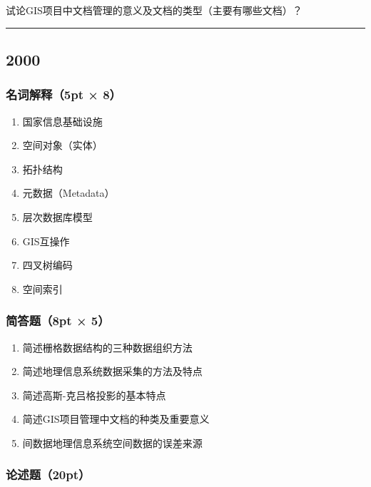 \documentclass[]{article}
\begin{document}
试论GIS项目中文档管理的意义及文档的类型（主要有哪些文档）？

\begin{center}\rule{0.5\linewidth}{\linethickness}\end{center}

\hypertarget{header-n70}{%
\subsection{2000}\label{header-n70}}

\hypertarget{header-n71}{%
\subsubsection{名词解释（5pt × 8）}\label{header-n71}}

\begin{enumerate}
\def\labelenumi{\arabic{enumi}.}
\item
  国家信息基础设施
\item
  空间对象（实体）
\item
  拓扑结构
\item
  元数据（Metadata）
\item
  层次数据库模型
\item
  GIS互操作
\item
  四叉树编码
\item
  空间索引
\end{enumerate}

\hypertarget{header-n89}{%
\subsubsection{简答题（8pt × 5）}\label{header-n89}}

\begin{enumerate}
\def\labelenumi{\arabic{enumi}.}
\item
  简述栅格数据结构的三种数据组织方法
\item
  简述地理信息系统数据采集的方法及特点
\item
  简述高斯-克吕格投影的基本特点
\item
  简述GIS项目管理中文档的种类及重要意义
\item
  间数据地理信息系统空间数据的误差来源
\end{enumerate}

\hypertarget{header-n101}{%
\subsubsection{论述题（20pt）}\label{header-n101}}
\end{document}
